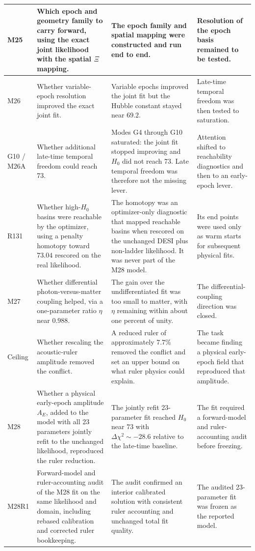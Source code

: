 {\begin{longtable}{>{\raggedright\arraybackslash}p{}>{\raggedright\arraybackslash}p{}>{\raggedright\arraybackslash}p{}>{\raggedright\arraybackslash}p{}}
\midrule
M25 & Which epoch and geometry family to carry forward, using the exact joint likelihood with the spatial $\Xi$ mapping. & The epoch family and spatial mapping were constructed and run end to end. & Resolution of the epoch basis remained to be tested. \\
\midrule
M26 & Whether variable-epoch resolution improved the exact joint fit. & Variable epochs improved the joint fit but the Hubble constant stayed near $69.2$. & Late-time temporal freedom was then tested to saturation. \\
\midrule
G10 / M26A & Whether additional late-time temporal freedom could reach $73$. & Modes G4 through G10 saturated: the joint fit stopped improving and $H_{0}$ did not reach $73$. Late temporal freedom was therefore not the missing lever. & Attention shifted to reachability diagnostics and then to an early-epoch lever. \\
\midrule
R131 & Whether high-$H_{0}$ basins were reachable by the optimizer, using a penalty homotopy toward $73.04$ rescored on the real likelihood. & The homotopy was an optimizer-only diagnostic that mapped reachable basins when rescored on the unchanged DESI plus non-ladder likelihood. It was never part of the M28 model. & Its end points were used only as warm starts for subsequent physical fits. \\
\midrule
M27 & Whether differential photon-versus-matter coupling helped, via a one-parameter ratio $\eta$ near $0.988$. & The gain over the undifferentiated fit was too small to matter, with $\eta$ remaining within about one percent of unity. & The differential-coupling direction was closed. \\
\midrule
Ceiling & Whether rescaling the acoustic-ruler amplitude removed the conflict. & A reduced ruler of approximately $7.7$\% removed the conflict and set an upper bound on what ruler physics could explain. & The task became finding a physical early-epoch field that reproduced that amplitude. \\
\midrule
M28 & Whether a physical early-epoch amplitude $A_{E}$, added to the model with all 23 parameters jointly refit to the unchanged likelihood, reproduced the ruler reduction. & The jointly refit 23-parameter fit reached $H_{0}$ near $73$ with $\Delta\chi^{2}\sim-28.6$ relative to the late-time baseline. & The fit required a forward-model and ruler-accounting audit before freezing. \\
\midrule
M28R1 & Forward-model and ruler-accounting audit of the M28 fit on the same likelihood and domain, including rebased calibration and corrected ruler bookkeeping. & The audit confirmed an interior calibrated solution with consistent ruler accounting and unchanged total fit quality. & The audited 23-parameter fit was frozen as the reported model. \\
\end{longtable}
}

